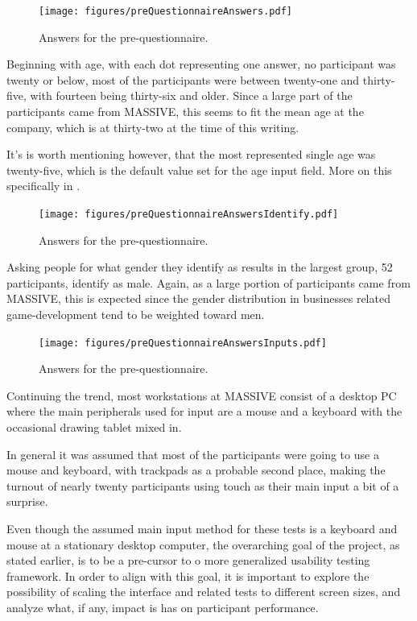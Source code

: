 \documentclass[nofilelist,dvipsnames]{cslthse-msc}
\begin{document}
				\begin{figure}[h!]
					\centering
					\texttt{[image: figures/preQuestionnaireAnswers.pdf]}
					\caption{Answers for the pre-questionnaire.}
				\end{figure}

        Beginning with age, with each dot representing one answer, no
        participant was twenty or below, most of the  participants were between
        twenty-one and thirty-five, with fourteen being thirty-six and older.
        Since a large part of the participants came from MASSIVE, this seems to
        fit the mean age at the company, which is at thirty-two{\findref} at
        the time of this writing.

        It's is worth mentioning however, that the most represented single age
        was twenty-five, which is the default value set for the age input
        field. More on this specifically in .

				\begin{figure}[h!]
					\centering
					\texttt{[image: figures/preQuestionnaireAnswersIdentify.pdf]}
					\caption{Answers for the pre-questionnaire.}
				\end{figure}

        Asking people for what gender they identify as results in the largest
        group, 52 participants, identify as male. Again, as a large portion of
        participants came from MASSIVE, this is expected since the gender
        distribution in businesses related game-development tend to be weighted
        toward men\findref\findref.

				\begin{figure}[h!]
					\centering
					\texttt{[image: figures/preQuestionnaireAnswersInputs.pdf]}
					\caption{Answers for the pre-questionnaire.}
				\end{figure}

        Continuing the trend, most workstations at MASSIVE consist of a
        desktop PC where the main peripherals used for input are a mouse and a
        keyboard with the occasional drawing tablet mixed in.

        In general it was assumed that most of the participants were going to
        use a mouse and keyboard, with trackpads as a probable second place,
        making the turnout of nearly twenty participants using touch as their
        main input a bit of a surprise.

        Even though the assumed main input method for these tests is a keyboard
        and mouse at a stationary desktop computer, the overarching goal of the
        project, as stated earlier, is to be a pre-cursor to o more generalized
        usability testing framework. In order to align with this goal, it is
        important to explore the possibility of scaling the interface and
        related tests to different screen sizes, and analyze what, if any,
        impact is has on participant performance.
\end{document}
